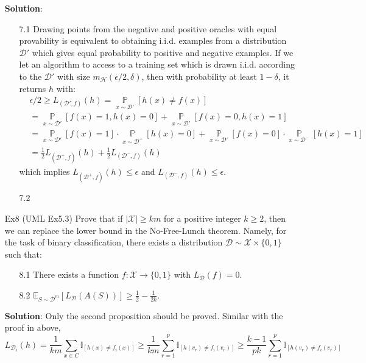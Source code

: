\documentclass{article}
\begin{document}
\begin{itemize}
\begin{itemize}
	\item[] \textbf{Solution}:
	\begin{itemize}
	\item[7.1] Drawing points from the negative and positive oracles with equal provability is equivalent to obtaining i.i.d. examples from a distribution $\mathcal{D}'$ which gives equal probability to positive and negative examples. If we let an algorithm to access to a training set which is drawn i.i.d. according to the $\mathcal{D}'$ with size $m_\mathcal{H}(\epsilon/2, \delta)$, then with probability at least $1-\delta$, it returns $h$ with:
	\begin{equation*}
	\begin{split}
	& \epsilon/2 \geq L_{(\mathcal{D}',f)}(h) = \mathop{\mathbb{P}}\limits_{x\sim\mathcal{D}'}[h(x)\neq f(x)] \\
	& = \mathop{\mathbb{P}}\limits_{x\sim\mathcal{D}'}[f(x)=1, h(x)=0] + \mathop{\mathbb{P}}\limits_{x\sim\mathcal{D}'}[f(x)=0, h(x)=1] \\
	& = \mathop{\mathbb{P}}\limits_{x\sim\mathcal{D}'}[f(x)=1] \cdot \mathop{\mathbb{P}}\limits_{x\sim\mathcal{D}^+}[h(x)=0] + \mathop{\mathbb{P}}\limits_{x\sim\mathcal{D}'}[f(x)=0] \cdot \mathop{\mathbb{P}}\limits_{x\sim\mathcal{D}^-}[h(x)=1] \\
	& = \frac{1}{2}L_{(\mathcal{D}^+,f)}(h) + \frac{1}{2}L_{(\mathcal{D}^-,f)}(h)
	\end{split} 
	\end{equation*}
which implies $L_{(\mathcal{D}^+,f)}(h)\leq\epsilon$ and $L_{(\mathcal{D}^-,f)}(h)\leq\epsilon$.
	\item[7.2] 
	\end{itemize}
	
\item[Ex8] (UML Ex5.3) Prove that if $|\mathcal{X}|\geq km$ for a positive integer $k\geq 2$, then we can replace the lower bound in the No-Free-Lunch theorem. Namely, for the task of binary classification, there exists a distribution $\mathcal{D}\sim\mathcal{X}\times\{0,1\}$ such that:

	\begin{itemize}
	\item[8.1] There exists a function $f:\mathcal{X}\rightarrow\{0,1\}$ with $L_\mathcal{D}(f)=0$.
	\item[8.2] $\mathbb{E}_{S\sim\mathcal{D}^m}[L_\mathcal{D}(A(S))]\geq\frac{1}{2}-\frac{1}{2k}$.
	\end{itemize}

\item[] \textbf{Solution}:
	Only the second proposition should be proved. Similar with the proof in above, 
	\begin{equation*}
	L_{\mathcal{D}_i}(h)=\frac{1}{km}\sum_{x\in C}\mathbb{I}_{[h(x)\neq f_i(x)]}\geq\frac{1}{km}\sum_{r=1}^p\mathbb{I}_{[h(v_r)\neq f_i(v_r)]}\geq\frac{k-1}{pk}\sum_{r=1}^p\mathbb{I}_{[h(v_r)\neq f_i(v_r)]}
	\end{equation*}
 

\end{itemize}
\end{itemize}
\end{document}
